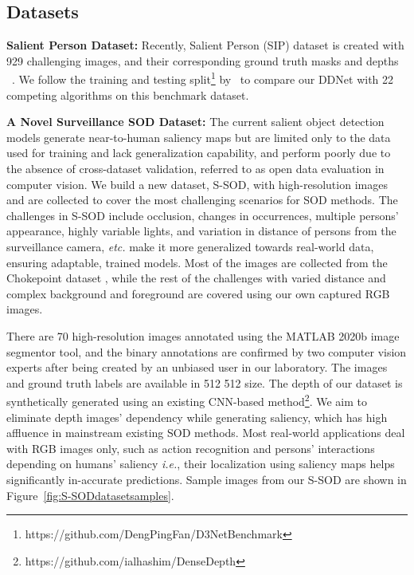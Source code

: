 \documentclass{article}
\newcommand{\latinphrase}[1]{\textit{#1}}
\newcommand{\ie}{\latinphrase{i.e.}\xspace}
\newcommand{\etc}{\latinphrase{etc.}\xspace}
\begin{document}
\subsection{Datasets}
\textbf{Salient Person Dataset:}
Recently, Salient Person (SIP) dataset is created with 929 challenging images, and their corresponding ground truth masks and depths ~\cite{fan2020rethinking}. We follow the training and testing split\footnote{https://github.com/DengPingFan/D3NetBenchmark} by~\cite{fan2020rethinking} to compare our DDNet with 22 competing algorithms on this benchmark dataset.

\vspace{2mm}
\noindent
\textbf{A Novel Surveillance SOD Dataset:}
\label{ss:dataset}
The current salient object detection models generate near-to-human saliency maps but are limited only to the data used for training and lack generalization capability, and perform poorly due to the absence of cross-dataset validation, referred to as open data evaluation in computer vision. We build a new dataset, S-SOD, with high-resolution images and are collected to cover the most challenging scenarios for SOD methods. The challenges in S-SOD include occlusion, changes in occurrences, multiple persons' appearance, highly variable lights, and variation in distance of persons from the surveillance camera, \etc make it more generalized towards real-world data, ensuring adaptable, trained models. Most of the images are collected from the Chokepoint dataset \cite{wong_cvprw_2011}, while the rest of the challenges with varied distance and complex background and foreground are covered using our own captured RGB images.

There are 70 high-resolution images annotated using the MATLAB 2020b image segmentor tool, and the binary annotations are confirmed by two computer vision experts after being created by an unbiased user in our laboratory. The images and ground truth labels are available in 512  512 size. The depth of our dataset is synthetically generated using an existing CNN-based method\footnote{https://github.com/ialhashim/DenseDepth}. We aim to eliminate depth images' dependency while generating saliency, which has high affluence in mainstream existing SOD methods. Most real-world applications deal with RGB images only, such as action recognition and persons' interactions depending on humans' saliency \ie, their localization using saliency maps helps significantly in-accurate predictions. Sample images from our S-SOD are shown in Figure~\ref{fig:S-SODdatasetsamples}.
\end{document}
